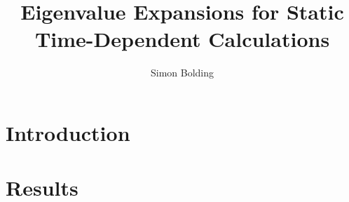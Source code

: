 \documentclass[12pt]{report}
\begin{document}
\title{Eigenvalue Expansions for Static Time-Dependent Calculations}%
\author{Simon Bolding\\ %
} %
 

\clearpage


%

\chapter{Introduction}










\chapter{Results}



%
\end{document}

